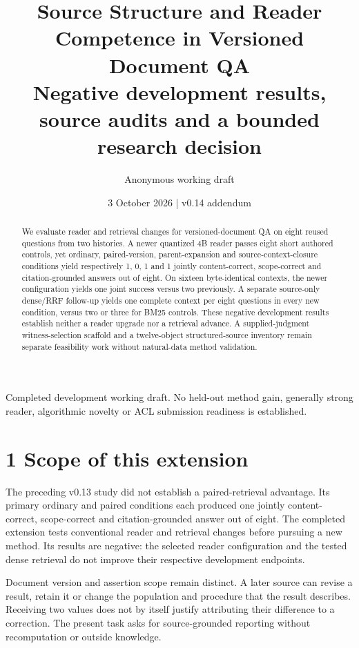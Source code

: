 \documentclass[11pt]{article}
\title{Source Structure and Reader Competence in Versioned Document QA\\[0.5em]\large Negative development results, source audits and a bounded research decision}
\author{Anonymous working draft}
\date{3 October 2026 | v0.14 addendum}
\begin{document}
\maketitle

Completed development working draft. No held-out method gain, generally strong reader, algorithmic novelty or ACL submission readiness is established.

\begin{abstract}

We evaluate reader and retrieval changes for versioned-document QA on eight reused questions from two histories. A newer quantized 4B reader passes eight short authored controls, yet ordinary, paired-version, parent-expansion and source-context-closure conditions yield respectively 1, 0, 1 and 1 jointly content-correct, scope-correct and citation-grounded answers out of eight. On sixteen byte-identical contexts, the newer configuration yields one joint success versus two previously. A separate source-only dense/RRF follow-up yields one complete context per eight questions in every new condition, versus two or three for BM25 controls. These negative development results establish neither a reader upgrade nor a retrieval advance. A supplied-judgment witness-selection scaffold and a twelve-object structured-source inventory remain separate feasibility work without natural-data method validation.

\end{abstract}

\section*{1  Scope of this extension}

The preceding v0.13 study did not establish a paired-retrieval advantage. Its primary ordinary and paired conditions each produced one jointly content-correct, scope-correct and citation-grounded answer out of eight. The completed extension tests conventional reader and retrieval changes before pursuing a new method. Its results are negative: the selected reader configuration and the tested dense retrieval do not improve their respective development endpoints.


Document version and assertion scope remain distinct. A later source can revise a result, retain it or change the population and procedure that the result describes. Receiving two values does not by itself justify attributing their difference to a correction. The present task asks for source-grounded reporting without recomputation or outside knowledge.
\end{document}
